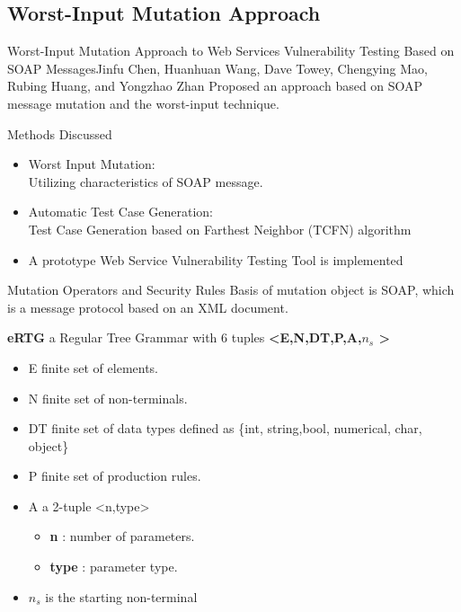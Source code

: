 \documentclass[10pt]{beamer}
\begin{document}
\subsection{Worst-Input Mutation Approach}
\begin{frame}{Worst-Input Mutation Approach to Web Services Vulnerability Testing Based on SOAP Messages}{Jinfu Chen, Huanhuan Wang, Dave Towey, Chengying Mao, Rubing Huang, and Yongzhao Zhan}
Proposed an approach based on SOAP message mutation and the worst-input technique.
\begin{block}{Methods Discussed}
\begin{itemize}
\item Worst Input Mutation:\\
		Utilizing characteristics of SOAP message.
\item Automatic Test Case Generation:\\
	Test Case Generation based on Farthest Neighbor (TCFN) algorithm
\item A prototype Web Service Vulnerability Testing Tool is implemented
\end{itemize}
\end{block}
\end{frame}
\begin{frame}{Mutation Operators and Security Rules}{}
Basis of mutation object is SOAP, which is a message protocol based on an XML document.
\begin{block}{\textbf{eRTG}}
a Regular Tree Grammar with 6 tuples \textbf{<E,N,DT,P,A,$n_s$ >}
\begin{itemize}
\item E finite set of elements.
\item N finite set of non-terminals.
\item DT finite set of data types defined as \{int, string,bool, numerical, char, object\}
\item P finite set of production rules.
\item A a 2-tuple <n,type>
\begin{itemize}
\item \textbf{n} : number of parameters.
\item \textbf{type} : parameter type.
\end{itemize} 
\item $n_s$ is the starting non-terminal
\end{itemize}
\end{block}
\end{frame}
\end{document}
